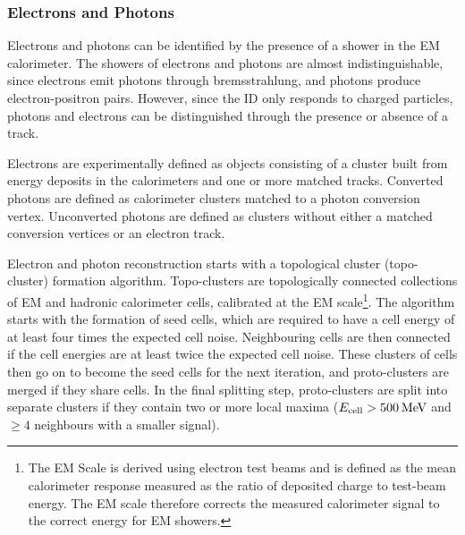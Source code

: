 \subsubsection{Electrons and Photons}\label{sec:egamma}
Electrons and photons can be identified by the presence of a shower in the EM calorimeter. The showers of electrons and photons are almost indistinguishable, since electrons emit photons through bremsstrahlung, and photons produce electron-positron pairs. However, since the ID only responds to charged particles, photons and electrons can be distinguished through the presence or absence of a track.

Electrons are experimentally defined as objects consisting of a cluster built from energy deposits in the calorimeters and one or more matched tracks. Converted photons are defined as calorimeter clusters matched to a photon conversion vertex. Unconverted photons are defined as clusters without either a matched conversion vertices or an electron track. 

Electron and photon reconstruction starts with a topological cluster (topo-cluster) formation algorithm. Topo-clusters are topologically connected collections of EM and hadronic calorimeter cells, calibrated at the EM scale\footnote{The EM Scale is derived using electron test beams and is defined as the mean calorimeter response measured as the ratio of deposited charge to test-beam energy. The EM scale therefore corrects the measured calorimeter signal to the correct energy for EM showers.}. The algorithm starts with the formation of seed cells, which are required to have a cell energy of at least four times the expected cell noise. Neighbouring cells are then connected if the cell energies are at least twice the expected cell noise. These clusters of cells then go on to become the seed cells for the next iteration, and proto-clusters are merged if they share cells. In the final splitting step, proto-clusters are split into separate clusters if they contain two or more local maxima ($E_{\text{cell}}>500\hspace{2pt}\text{Me\kern -0.1em V}$ and $\geq4$ neighbours with a smaller signal).

